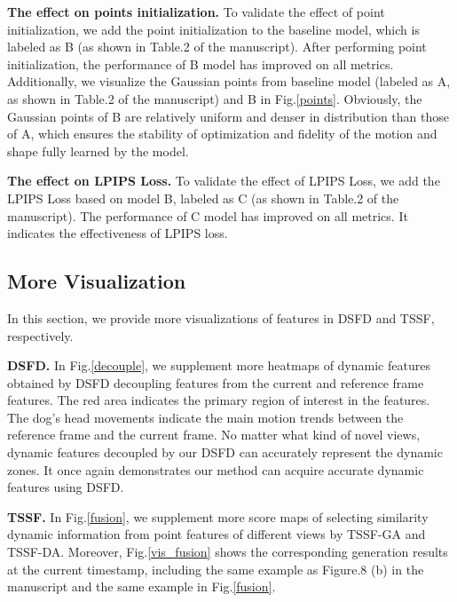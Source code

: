 \textbf{The effect on points initialization.} To validate the effect of point initialization, we add the point initialization to the baseline model, which is labeled as B (as shown in Table.2 of the manuscript). After performing point initialization, the performance of B model has improved on all metrics. Additionally, we visualize the Gaussian points from baseline model (labeled as A, as shown in Table.2 of the manuscript) and B in Fig.\ref{points}. Obviously, the Gaussian points of B are relatively uniform and denser in distribution than those of A, which ensures the stability of optimization and fidelity of the motion and shape fully learned by the model.



\textbf{The effect on LPIPS Loss.} To validate the effect of LPIPS Loss, we add the LPIPS Loss based on model B, labeled as C (as shown in Table.2 of the manuscript). The performance of C model has improved on all metrics. It indicates the effectiveness of LPIPS loss. 


\subsection{More Visualization}
In this section, we provide more visualizations of features in DSFD and TSSF, respectively.

\textbf{DSFD.} In Fig.\ref{decouple}, we supplement more heatmaps of dynamic features obtained by DSFD decoupling features from the current and reference frame features. The red area indicates the primary region of interest in the features. The dog's head movements indicate the main motion trends between the reference frame and the current frame. No matter what kind of novel views, dynamic features decoupled by our DSFD can accurately represent the dynamic zones. It once again demonstrates our method can acquire accurate dynamic features using DSFD.


\textbf{TSSF.} In Fig.\ref{fusion}, we supplement more score maps of selecting similarity dynamic information from point features of different views by TSSF-GA and TSSF-DA. Moreover, Fig.\ref{vis_fusion} shows the corresponding generation results at the current timestamp, including the same example as Figure.8 (b) in the manuscript and the same example in Fig.\ref{fusion}.

